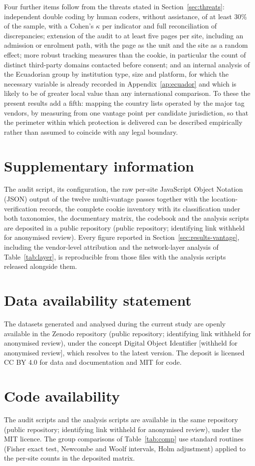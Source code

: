 \documentclass[]{interact}
\newcommand{\deposito}{(public repository; identifying link withheld for anonymised review)}
\newcommand{\depositodoi}{[withheld for anonymised review]}
\newcommand{\deposito}{\citep{deposito2026}}
\newcommand{\depositodoi}{\path{10.5281/zenodo.22405998}}
\begin{document}
Four further items follow from the threats stated in Section~\ref{sec:threats}: independent double coding by human coders, without assistance, of at least 30\% of the sample, with a Cohen's $\kappa$ per indicator and full reconciliation of discrepancies; extension of the audit to at least five pages per site, including an admission or enrolment path, with the page as the unit and the site as a random effect; more robust tracking measures than the cookie, in particular the count of distinct third-party domains contacted before consent; and an internal analysis of the Ecuadorian group by institution type, size and platform, for which the necessary variable is already recorded in Appendix~\ref{ap:ecuador} and which is likely to be of greater local value than any international comparison. To these the present results add a fifth: mapping the country lists operated by the major tag vendors, by measuring from one vantage point per candidate jurisdiction, so that the perimeter within which protection is delivered can be described empirically rather than assumed to coincide with any legal boundary.


\section*{Supplementary information}
The audit script, its configuration, the raw per-site JavaScript Object Notation (JSON) output of the twelve multi-vantage passes together with the location-verification records, the complete cookie inventory with its classification under both taxonomies, the documentary matrix, the codebook and the analysis scripts are deposited in a public repository \deposito{}. Every figure reported in Section~\ref{sec:results-vantage}, including the vendor-level attribution and the network-layer analysis of Table~\ref{tab:layer}, is reproducible from those files with the analysis scripts released alongside them.

\section*{Data availability statement}
The datasets generated and analysed during the current study are openly available in the Zenodo repository \deposito{}, under the concept Digital Object Identifier \depositodoi{}, which resolves to the latest version. The deposit is licensed CC BY 4.0 for data and documentation and MIT for code.

\section*{Code availability}
The audit scripts and the analysis scripts are available in the same repository \deposito{}, under the MIT licence. The group comparisons of Table~\ref{tab:comp} use standard routines (Fisher exact test, Newcombe and Woolf intervals, Holm adjustment) applied to the per-site counts in the deposited matrix.
\end{document}
